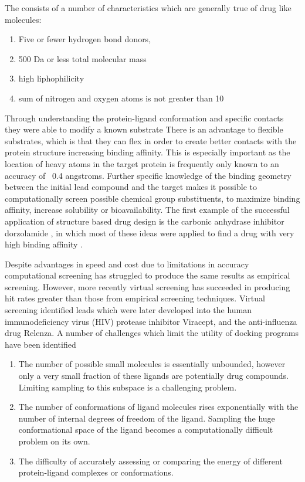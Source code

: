 The consists of a number of characteristics which are generally true of drug like molecules:
\begin{enumerate}
\item Five or fewer hydrogen bond donors,
\item 500 Da or less total molecular mass
\item high liphophilicity
\item sum of nitrogen and oxygen atoms is not greater than 10 \cite{rule_of_five}
\end{enumerate}

Through understanding the protein-ligand conformation and specific contacts they were able to modify a known substrate 
There is an advantage to flexible substrates, which is that they can flex in order to create better contacts with the protein structure increasing binding affinity.
This is especially important as the location of heavy atoms in the target protein is frequently only known to an accuracy of ~0.4 angstroms.
Further specific knowledge of the binding geometry between the initial lead compound and the target makes it possible to computationally screen possible chemical group substituents, to maximize binding affinity, increase solubility or bioavailability.
The first example of the successful application of structure based drug design is the carbonic anhydrase inhibitor dorzolamide
, in which most of these ideas were applied to find a drug with very high binding affinity \cite{greer1994application}.

Despite advantages in speed and cost due to limitations in accuracy computational screening has struggled to produce the same results as empirical screening.
However, more recently virtual screening has succeeded in producing hit rates greater than those from empirical screening techniques.
Virtual screening identified leads which were later developed into the human immunodeficiency virus (HIV) protease inhibitor Viracept, and the anti-influenza drug Relenza.
A number of challenges which limit the utility of docking programs have been identified
\begin{enumerate}
\item The number of possible small molecules is essentially unbounded, however only a very small fraction of these ligands are potentially drug compounds. Limiting sampling to this subspace is a challenging problem.
\item The number of conformations of ligand molecules rises exponentially with the number of internal degrees of freedom of the ligand.  Sampling the huge conformational space of the ligand becomes a computationally difficult problem on its own.
\item The difficulty of accurately assessing or comparing the energy of different protein-ligand complexes or conformations.
\end{enumerate}
\cite{shoichet2004virtual}
